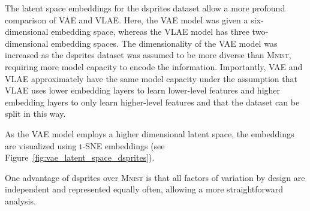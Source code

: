 The latent space embeddings for the dsprites dataset allow a more profound comparison of \ac{VAE} and \ac{VLAE}.
Here, the \ac{VAE} model was given a six-dimensional embedding space, whereas the \ac{VLAE} model has three two-dimensional embedding spaces.
The dimensionality of the \ac{VAE} model was increased as the dsprites dataset was assumed to be more diverse than \textsc{Mnist}, requiring more model capacity to encode the information.
Importantly, \ac{VAE} and \ac{VLAE} approximately have the same model capacity under the assumption that \ac{VLAE} uses lower embedding layers to learn lower-level features and higher embedding layers to only learn higher-level features and that the dataset can be split in this way.

As the \ac{VAE} model employs a higher dimensional latent space, the embeddings are visualized using \ac{t-SNE} embeddings (see Figure~\ref{fig:vae_latent_space_dsprites}).

One advantage of dsprites over \textsc{Mnist} is that all factors of variation by design are independent and represented equally often, allowing a more straightforward analysis.

